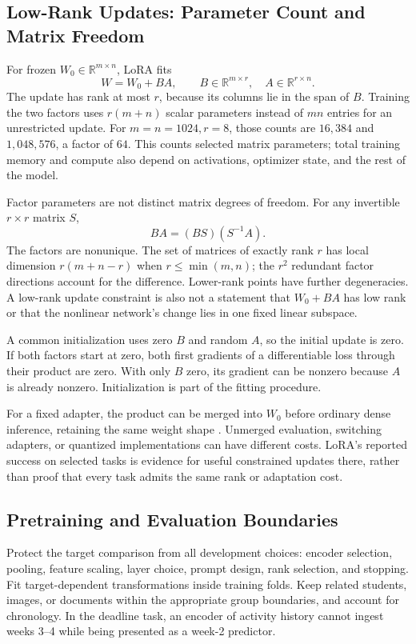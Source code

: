 \subsection{Low-Rank Updates: Parameter Count and Matrix Freedom}

For frozen $W_0\in\mathbb R^{m\times n}$, LoRA fits
\[
W=W_0+BA,\qquad B\in\mathbb R^{m\times r},\quad A\in\mathbb R^{r\times n}.
\]
The update has rank at most $r$, because its columns lie in the span of $B$. Training the two factors uses $r(m+n)$ scalar parameters instead of $mn$ entries for an unrestricted update. For $m=n=1024,r=8$, those counts are $16{,}384$ and $1{,}048{,}576$, a factor of $64$. This counts selected matrix parameters; total training memory and compute also depend on activations, optimizer state, and the rest of the model.

Factor parameters are not distinct matrix degrees of freedom. For any invertible $r\times r$ matrix $S$,
\[
BA=(BS)(S^{-1}A).
\]
The factors are nonunique. The set of matrices of exactly rank $r$ has local dimension $r(m+n-r)$ when $r\le\min(m,n)$; the $r^2$ redundant factor directions account for the difference. Lower-rank points have further degeneracies. A low-rank update constraint is also not a statement that $W_0+BA$ has low rank or that the nonlinear network's change lies in one fixed linear subspace.

A common initialization uses zero $B$ and random $A$, so the initial update is zero. If both factors start at zero, both first gradients of a differentiable loss through their product are zero. With only $B$ zero, its gradient can be nonzero because $A$ is already nonzero. Initialization is part of the fitting procedure.

For a fixed adapter, the product can be merged into $W_0$ before ordinary dense inference, retaining the same weight shape \citep{hu2021lora}. Unmerged evaluation, switching adapters, or quantized implementations can have different costs. LoRA's reported success on selected tasks is evidence for useful constrained updates there, rather than proof that every task admits the same rank or adaptation cost.

\subsection{Pretraining and Evaluation Boundaries}

Protect the target comparison from all development choices: encoder selection, pooling, feature scaling, layer choice, prompt design, rank selection, and stopping. Fit target-dependent transformations inside training folds. Keep related students, images, or documents within the appropriate group boundaries, and account for chronology. In the deadline task, an encoder of activity history cannot ingest weeks 3--4 while being presented as a week-2 predictor.

